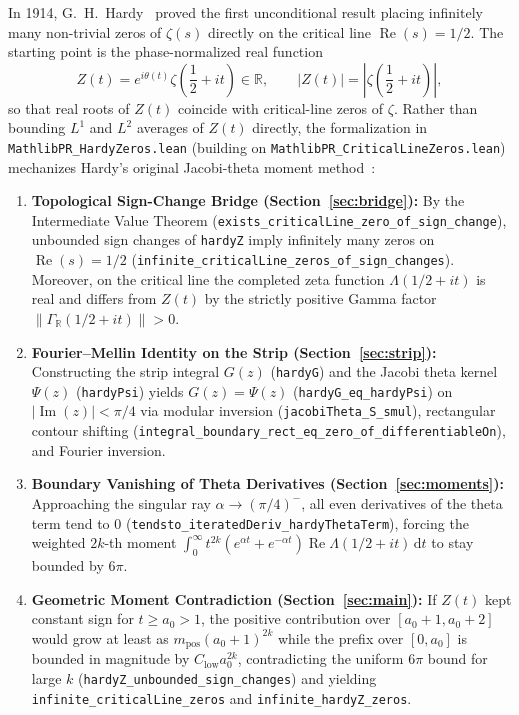 \documentclass[11pt,a4paper]{article}
\theoremstyle{definition}
\newcommand{\dee}{\mathrm{d}}
\newcommand{\Rset}{\mathbb{R}}
\begin{document}
In 1914, G.~H.~Hardy~\cite{hardy1914} proved the first unconditional result placing infinitely many non-trivial zeros of $\zeta(s)$ directly on the critical line $\operatorname{Re}(s) = 1/2$. The starting point is the phase-normalized real function
\begin{equation}\label{eq:hardy_z_def}
Z(t) = e^{i\theta(t)} \zeta\!\left(\frac{1}{2} + it\right) \in \Rset, \qquad |Z(t)| = \left|\zeta\!\left(\frac{1}{2} + it\right)\right|,
\end{equation}
so that real roots of $Z(t)$ coincide with critical-line zeros of $\zeta$. Rather than bounding $L^1$ and $L^2$ averages of $Z(t)$ directly, the formalization in \texttt{MathlibPR\_\allowbreak HardyZeros.lean} (building on \texttt{MathlibPR\_\allowbreak CriticalLineZeros.lean}) mechanizes Hardy's original Jacobi-theta moment method~\cite{hardy1914, titchmarsh1986}:
\begin{enumerate}[noitemsep]
\item \textbf{Topological Sign-Change Bridge (Section~\ref{sec:bridge}):} By the Intermediate Value Theorem (\texttt{exists\_\allowbreak criticalLine\_\allowbreak zero\_\allowbreak of\_sign\_\allowbreak change}), unbounded sign changes of \texttt{hardyZ} imply infinitely many zeros on $\operatorname{Re}(s)=1/2$ (\texttt{infinite\_\allowbreak criticalLine\_\allowbreak zeros\_\allowbreak of\_sign\_\allowbreak changes}). Moreover, on the critical line the completed zeta function $\Lambda(1/2+it)$ is real and differs from $Z(t)$ by the strictly positive Gamma factor $\|\Gamma_{\Rset}(1/2+it)\| > 0$.
\item \textbf{Fourier--Mellin Identity on the Strip (Section~\ref{sec:strip}):} Constructing the strip integral $G(z)$ (\texttt{hardyG}) and the Jacobi theta kernel $\Psi(z)$ (\texttt{hardyPsi}) yields $G(z) = \Psi(z)$ (\texttt{hardyG\_\allowbreak eq\_\allowbreak hardyPsi}) on $|\operatorname{Im}(z)| < \pi/4$ via modular inversion (\texttt{jacobiTheta\_\allowbreak S\_smul}), rectangular contour shifting (\texttt{integral\_\allowbreak boundary\_\allowbreak rect\_\allowbreak eq\_zero\_\allowbreak of\_\allowbreak differentiableOn}), and Fourier inversion.
\item \textbf{Boundary Vanishing of Theta Derivatives (Section~\ref{sec:moments}):} Approaching the singular ray $\alpha \to (\pi/4)^-$, all even derivatives of the theta term tend to $0$ (\texttt{tendsto\_\allowbreak iteratedDeriv\_\allowbreak hardyThetaTerm}), forcing the weighted $2k$-th moment $\int_0^\infty t^{2k}(e^{\alpha t} + e^{-\alpha t}) \operatorname{Re}\Lambda(1/2+it)\,\dee t$ to stay bounded by $6\pi$.
\item \textbf{Geometric Moment Contradiction (Section~\ref{sec:main}):} If $Z(t)$ kept constant sign for $t \ge a_0 > 1$, the positive contribution over $[a_0+1, a_0+2]$ would grow at least as $m_{\text{pos}}(a_0+1)^{2k}$ while the prefix over $[0, a_0]$ is bounded in magnitude by $C_{\text{low}} a_0^{2k}$, contradicting the uniform $6\pi$ bound for large $k$ (\texttt{hardyZ\_\allowbreak unbounded\_\allowbreak sign\_\allowbreak changes}) and yielding \texttt{infinite\_\allowbreak criticalLine\_\allowbreak zeros} and \texttt{infinite\_\allowbreak hardyZ\_\allowbreak zeros}.
\end{enumerate}
\end{document}
